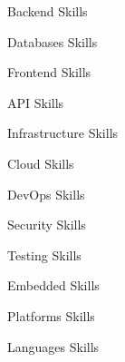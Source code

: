 

\begin{cvskills}

  \cvskill
    {Backend} %
    {Skills} %

  \cvskill
    {Databases} %
    {Skills} %

  \cvskill
    {Frontend} %
    {Skills} %

  \cvskill
    {API} %
    {Skills} %

  \cvskill
    {Infrastructure} %
    {Skills} %

  \cvskill
    {Cloud} %
    {Skills} %

  \cvskill
    {DevOps} %
    {Skills} %

  \cvskill
    {Security} %
    {Skills} %

  \cvskill
    {Testing} %
    {Skills} %

  \cvskill
    {Embedded} %
    {Skills} %

  \cvskill
    {Platforms} %
    {Skills} %

  \cvskill
    {Languages} %
    {Skills} %

\end{cvskills}
